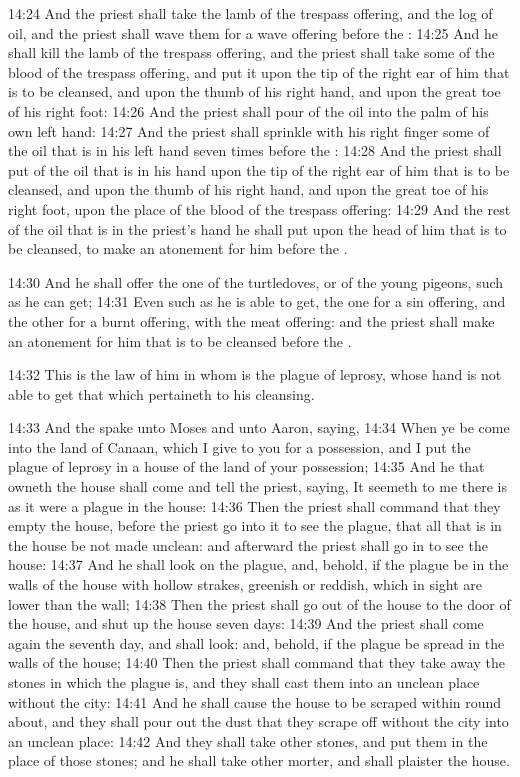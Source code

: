 14:24 And the priest shall take the lamb of the trespass offering, and the log of oil, and the priest shall wave them for a wave offering before the \LORD: 14:25 And he shall kill the lamb of the trespass offering, and the priest shall take some of the blood of the trespass offering, and put it upon the tip of the right ear of him that is to be cleansed, and upon the thumb of his right hand, and upon the great toe of his right foot: 14:26 And the priest shall pour of the oil into the palm of his own left hand: 14:27 And the priest shall sprinkle with his right finger some of the oil that is in his left hand seven times before the \LORD: 14:28 And the priest shall put of the oil that is in his hand upon the tip of the right ear of him that is to be cleansed, and upon the thumb of his right hand, and upon the great toe of his right foot, upon the place of the blood of the trespass offering: 14:29 And the rest of the oil that is in the priest's hand he shall put upon the head of him that is to be cleansed, to make an atonement for him before the \LORD.

14:30 And he shall offer the one of the turtledoves, or of the young pigeons, such as he can get; 14:31 Even such as he is able to get, the one for a sin offering, and the other for a burnt offering, with the meat offering: and the priest shall make an atonement for him that is to be cleansed before the \LORD.

14:32 This is the law of him in whom is the plague of leprosy, whose hand is not able to get that which pertaineth to his cleansing.

14:33 And the \LORD spake unto Moses and unto Aaron, saying, 14:34 When ye be come into the land of Canaan, which I give to you for a possession, and I put the plague of leprosy in a house of the land of your possession; 14:35 And he that owneth the house shall come and tell the priest, saying, It seemeth to me there is as it were a plague in the house: 14:36 Then the priest shall command that they empty the house, before the priest go into it to see the plague, that all that is in the house be not made unclean: and afterward the priest shall go in to see the house: 14:37 And he shall look on the plague, and, behold, if the plague be in the walls of the house with hollow strakes, greenish or reddish, which in sight are lower than the wall; 14:38 Then the priest shall go out of the house to the door of the house, and shut up the house seven days: 14:39 And the priest shall come again the seventh day, and shall look: and, behold, if the plague be spread in the walls of the house; 14:40 Then the priest shall command that they take away the stones in which the plague is, and they shall cast them into an unclean place without the city: 14:41 And he shall cause the house to be scraped within round about, and they shall pour out the dust that they scrape off without the city into an unclean place: 14:42 And they shall take other stones, and put them in the place of those stones; and he shall take other morter, and shall plaister the house.

